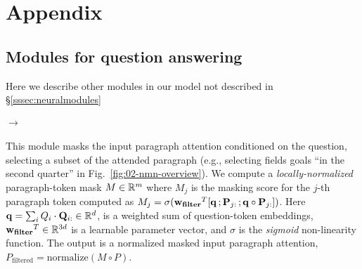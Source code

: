 \documentclass{article}
\begin{document}
\section{Appendix}

\subsection{Modules for question answering}
\label{appendix:modules}
Here we describe other modules in our model not described in \S\ref{sssec:neuralmodules}


\paragraph{ $\rightarrow$ }\mbox{}
This module masks the input paragraph attention conditioned on the question, selecting a subset of the attended paragraph (e.g., selecting fields goals ``in the second quarter'' in Fig.~\ref{fig:02-nmn-overview}).
We compute a \textit{locally-normalized} paragraph-token mask $M \in \mathbb{R}^{m}$ where $M_{j}$ is the masking score for the $j$-th paragraph token computed as
$M_{j} = \sigma (\mathbf{w_{filter}}^{T} [\mathbf{q}\, ; \mathbf{P}_{j:}\, ; \mathbf{q} \circ \mathbf{P}_{j:}] )$. Here $\mathbf{q} = \sum_{i} Q_{i} \cdot \mathbf{Q}_{i:} \in \mathbb{R}^{d}$, is a weighted sum of question-token embeddings, $\mathbf{w_{filter}}^{T} \in \mathbb{R}^{3d}$ is a learnable parameter vector, and $\sigma$ is the \textit{sigmoid} non-linearity function.
The output is a normalized masked input paragraph attention, $P_{\text{filtered}} = \text{normalize}(M \circ P)$.

\end{document}

